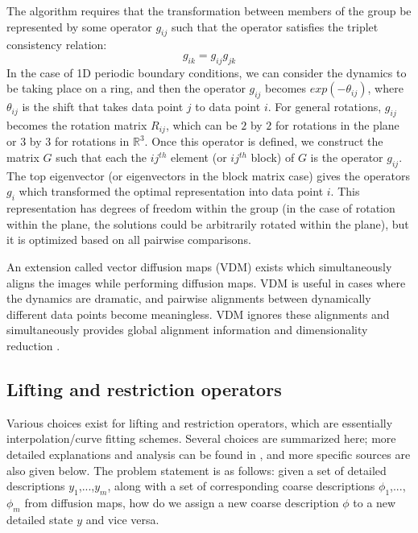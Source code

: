 \documentclass[12pt]{article}
\begin{document}
The algorithm requires that the transformation between members of the group be represented by some operator $g_{ij}$ such that the operator satisfies the triplet consistency relation:
\[
g_{ik} = g_{ij}g_{jk}
\]
In the case of 1D periodic boundary conditions, we can consider the dynamics to be taking place on a ring, and then the operator $g_{ij}$ becomes $exp(-\theta_{ij})$, where $\theta_{ij}$ is the shift that takes data point $j$ to data point $i$. For general rotations, $g_{ij}$ becomes the rotation matrix $R_{ij}$, which can be $2$ by $2$ for rotations in the plane or $3$ by $3$ for rotations in $\mathbb{R}^3$. Once this operator is defined, we construct the matrix $G$ such that each the $ij^{th}$ element (or $ij^{th}$  block) of $G$ is the operator $g_{ij}$. The top eigenvector (or eigenvectors in the block matrix case) gives the operators $g_i$ which transformed the optimal representation into data point $i$. This representation has degrees of freedom within the group (in the case of rotation within the plane, the solutions could be arbitrarily rotated within the plane), but it is optimized based on all pairwise comparisons. \vspace{1mm}

An extension called vector diffusion maps (VDM) exists which simultaneously aligns the images while performing diffusion maps. VDM is useful in cases where the dynamics are dramatic, and pairwise alignments between dynamically different data points become meaningless. VDM ignores these alignments and simultaneously provides global alignment information and dimensionality reduction \cite{Sonday2013, Dsilva}.

\subsection{Lifting and restriction operators} \label{DMLR}

Various choices exist for lifting and restriction operators, which are essentially interpolation/curve fitting schemes. Several choices are summarized here; more detailed explanations and analysis can be found in \cite{Chiavazzo2014}, and more specific sources are also given below. The problem statement is as follows: given a set of detailed descriptions $y_1$,...,$y_\textit{m}$, along with a set of corresponding coarse descriptions $\phi_1$,...,$\phi_\textit{m}$ from diffusion maps, how do we assign a new coarse description $\phi$ to a new detailed state $y$ and vice versa.
\end{document}
